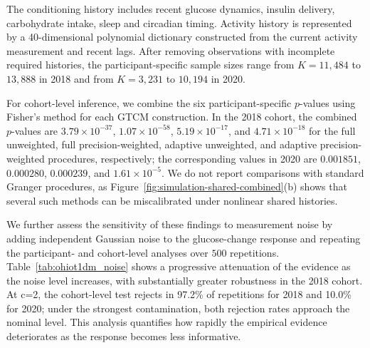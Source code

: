 \documentclass[12pt]{article}
\numberwithin{equation}{section}
\begin{document}
The conditioning history includes recent glucose dynamics, insulin delivery, carbohydrate intake, sleep and circadian timing. Activity history is represented by a 40-dimensional polynomial dictionary constructed from the current activity measurement and recent lags. After removing observations with incomplete required histories, the participant-specific sample sizes range from $K=11{,}484$ to $13{,}888$ in 2018 and from $K=3{,}231$ to $10{,}194$ in 2020.

For cohort-level inference, we combine the six participant-specific \(p\)-values using Fisher's method for each GTCM construction. In the 2018 cohort, the combined \(p\)-values are \(3.79\times10^{-37}\), \(1.07\times10^{-58}\), \(5.19\times10^{-17}\), and \(4.71\times10^{-18}\) for the full unweighted, full precision-weighted, adaptive unweighted, and adaptive precision-weighted procedures, respectively; the corresponding values in 2020 are \(0.001851\), \(0.000280\), \(0.000239\), and \(1.61\times10^{-5}\). We do not report comparisons with standard Granger procedures, as Figure~\ref{fig:simulation-shared-combined}(b) shows that several such methods can be miscalibrated under nonlinear shared histories.


We further assess the sensitivity of these findings to measurement noise by adding independent Gaussian noise to the glucose-change response and repeating the participant- and cohort-level analyses over $500$ repetitions. Table~\ref{tab:ohiot1dm_noise} shows a progressive attenuation of the evidence as the noise level increases, with substantially greater robustness in the 2018 cohort. At c=2, the cohort-level test rejects in 97.2\% of repetitions for 2018 and 10.0\% for 2020; under the strongest contamination, both rejection rates approach the nominal level. This analysis quantifies how rapidly the empirical evidence deteriorates as the response becomes less informative.
\end{document}
